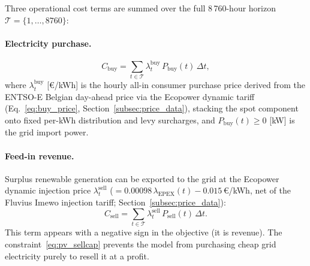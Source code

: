 \documentclass[11pt,a4paper]{report}
\begin{document}
Three operational cost terms are summed over the full 8\,760-hour horizon
$\mathcal{T} = \{1,\ldots,8760\}$:

\paragraph{Electricity purchase.}
\begin{equation}
    C_\mathrm{buy} = \sum_{t \in \mathcal{T}} \lambda_t^\mathrm{buy}\,P_\mathrm{buy}(t)\,\Delta t,
    \label{eq:opex_buy}
\end{equation}
where $\lambda_t^\mathrm{buy}$ [\euro/kWh] is the hourly all-in consumer purchase
price derived from the ENTSO-E Belgian day-ahead price via the Ecopower dynamic
tariff (Eq.~\eqref{eq:buy_price}, Section~\ref{subsec:price_data}),
stacking the spot component onto fixed per-kWh distribution and levy surcharges,
and $P_\mathrm{buy}(t) \geq 0$ [kW] is the grid import power.

\paragraph{Feed-in revenue.}
Surplus renewable generation can be exported to the grid at the Ecopower
dynamic injection price $\lambda_t^\mathrm{sell}$
($= 0.00098\,\lambda_\mathrm{EPEX}(t) - 0.015$\,\euro/kWh, net of the Fluvius
Imewo injection tariff; Section~\ref{subsec:price_data}):
\begin{equation}
    C_\mathrm{sell} = \sum_{t \in \mathcal{T}} \lambda_t^\mathrm{sell}\,P_\mathrm{sell}(t)\,\Delta t.
    \label{eq:opex_sell}
\end{equation}
This term appears with a negative sign in the objective (it is revenue). The
constraint~\eqref{eq:pv_sellcap} prevents the model from purchasing cheap
grid electricity purely to resell it at a profit.
\end{document}
